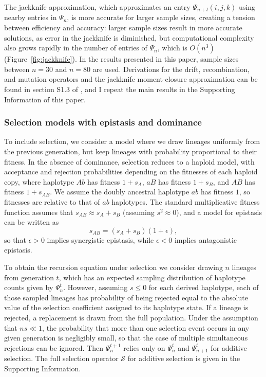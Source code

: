 \documentclass[]{article}
\begin{document}
The jackknife approximation, which approximates an entry \(\Psi_{n+l}(i,j,k)\)
using nearby entries in \(\Psi_n\), is more accurate for larger sample sizes,
creating a tension between efficiency and accuracy: larger sample sizes result
in more accurate solutions, as error in the jackknife is diminished, but
computational complexity also grows rapidly in the number of entries of
\(\Psi_n\), which is \(O(n^3)\) (Figure~\ref{fig:jackknife}). In the results
presented in this paper, sample sizes between \(n=30\) and \(n=80\) are used.
Derivations for the drift, recombination, and mutation operators and the
jackknife moment-closure approximation can be found in section S1.3 of
\citet{Ragsdale2019-nt}, and I repeat the main results in the Supporting
Information of this paper.

\subsubsection{Selection models with epistasis and dominance}

To include selection, we consider a model where we draw lineages uniformly from
the previous generation, but keep lineages with probability proportional to
their fitness. In the absence of dominance, selection reduces to a haploid
model, with acceptance and rejection probabilities depending on the fitnesses
of each haploid copy, where haplotype \(Ab\) has fitness \(1 + s_{A}\), \(aB\)
has fitness \(1 + s_{B}\), and \(AB\) has fitness \(1 + s_{AB}\). We assume the
doubly ancestral haplotype \(ab\) has fitness \(1\), so fitnesses are relative
to that of \(ab\) haplotypes. The standard multiplicative fitness function
assumes that \(s_{AB} \approx s_{A} + s_{B}\) (assuming \(s^2\approx0\)), and a
model for epistasis can be written as \[s_{AB} = (s_{A} + s_{B}) (1 +
\epsilon),\] so that \(\epsilon > 0\) implies synergistic epistasis, while
\(\epsilon < 0\) implies antagonistic epistasis.

To obtain the recursion equation under selection we consider drawing \(n\)
lineages from generation \(t\), which has an expected sampling distribution of
haplotype counts given by \(\Psi_n^t\). However, assuming \(s\leq0\) for each
derived haplotype, each of those sampled lineages has probability of being
rejected equal to the absolute value of the selection coefficient assigned to
its haplotype state. If a lineage is rejected, a replacement is drawn from the
full population. Under the assumption that \(ns \ll 1\), the probability that
more than one selection event occurs in any given generation is negligibly
small, so that the case of multiple simultaneous rejections can be ignored.
Then \(\Psi_n^{t+1}\) relies only on \(\Psi_n^t\) and \(\Psi_{n+1}^t\) for
additive selection. The full selection operator \(\mathcal{S}\) for additive
selection is given in the Supporting Information.
\end{document}
